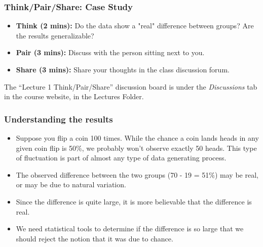 \documentclass[slidestop,compress,mathserif]{beamer}
\begin{document}
\begin{frame}
	\frametitle{Think/Pair/Share: Case Study}
	\begin{itemize}
		\item \textbf{Think (2 mins):} Do the data show a "real" difference between groups? Are the results generalizable?
		\item \textbf{Pair (3 mins):} Discuss with the person sitting next to you.
		\item \textbf{Share (3 mins):} Share your thoughts in the class discussion forum.
	\end{itemize}

	The ``Lecture 1 Think/Pair/Share'' discussion board is under the \textit{Discussions} tab in the course website, in the Lectures Folder. %
\end{frame}

\begin{frame}
\frametitle{Understanding the results}



\begin{itemize}

\item Suppose you flip a coin 100 times. While the chance a coin lands heads in any given coin flip is 50\%, we probably won't observe exactly 50 heads. This type of fluctuation is part of almost any type of data generating process.

\item The observed difference between the two groups (70 - 19 = 51\%) may be real, or may be due to natural variation.

\item Since the difference is quite large, it is more believable that the difference is real.

\item We need statistical tools to determine if the difference is so large that we should reject the notion that it was due to chance.

\end{itemize}

\end{frame}

\end{document}
